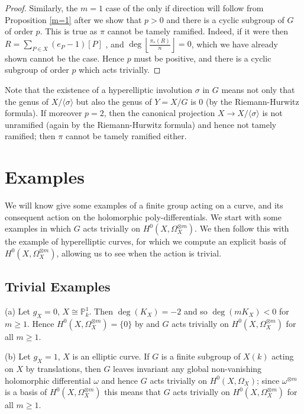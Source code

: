 \begin{proof}
    Similarly, the $m=1$ case of the only if direction will follow from Proposition \ref{m=1} after we show that $p>0$ and there is a cyclic subgroup of $G$ of order $p$. 
    This is true as $\pi$ cannot be tamely ramified.
    Indeed, if it were then $R=\sum_{P\in X} (e_P-1)[P]$ \cite[Chap. IV, Cor. 2.4]{hart}, and $\deg\left\lfloor \frac{\pi_*(R)}{n} \right\rfloor=0$, which we have already shown cannot be the case.
    Hence $p$ must be positive, and there is a cyclic subgroup of order $p$ which acts trivially.
    \end{proof}

    \begin{rem}
    Note that the existence of a hyperelliptic involution $\sigma$ in $G$ means not only that the genus of $X/\langle \sigma \rangle$ but also the genus of $Y=X/G$ is $0$ (by the Riemann-Hurwitz formula).
    If moreover $p=2$, then the canonical projection $X\rightarrow X/\langle \sigma \rangle$ is not unramified (again by the Riemann-Hurwitz formula) and hence not tamely ramified; then $\pi$ cannot be tamely ramified either.
    \end{rem}


\section{Examples}
We will know give some examples of a finite group acting on a curve, and its consequent action on the holomorphic poly-differentials. 
We start with some examples in which $G$ acts trivially on $H^0(X,\Omega_X^{\otimes m})$.
We then follow this with the example of hyperelliptic curves, for which we compute an explicit basis of $H^0(X,\Omega_X^{\otimes m})$, allowing us to see when the action is trivial.


\subsection{Trivial Examples}\label{examplessection}


(a) Let $g_X = 0$, \ie $X\cong \mathbb P_k^1$.
Then $\deg(K_X) = -2$ and so $\deg(mK_X) < 0$ for $m\geq 1$.
Hence $H^0(X,\Omega_X^{\otimes m}) =\{0\}$ by \cite[Lem. 2, pg. 295]{hart} and $G$ acts trivially on $H^0(X,\Omega_X^{\otimes m})$ for all $m\geq 1$.

(b) Let $g_X = 1$, \ie $X$ is an elliptic curve.
If $G$ is a finite subgroup of $X(k)$ acting on $X$ by translations, then $G$ leaves invariant any global non-vanishing holomorphic differential $\omega$ and hence $G$ acts trivially on $H^0(X,\Omega_X)$;
since $\omega^{\otimes m}$ is a basis of $H^0(X,\Omega_X^{\otimes m})$ this means that $G$ acts trivially on $H^0(X,\Omega_X^{\otimes m})$ for all $m\geq 1$.

